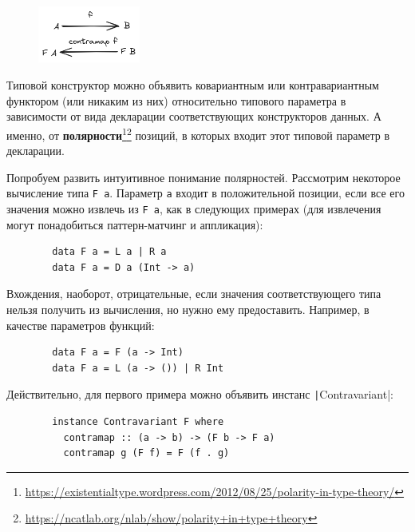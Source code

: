 \documentclass[12pt]{article}
\newcommand{\vocab}[1]{\textbf{#1}} %
\begin{document}
    \begin{figure}[H]
        \centering
        \includegraphics[width=0.3\textwidth]{figs/contra-functor}
    \end{figure}

    Типовой конструктор можно объявить ковариантным или контравариантным функтором (или никаким из них) относительно типового параметра в зависимости от вида декларации соответствующих конструкторов данных.
    А именно, от \vocab{полярности}\footnote{\url{https://existentialtype.wordpress.com/2012/08/25/polarity-in-type-theory/}}\footnote{\url{https://ncatlab.org/nlab/show/polarity+in+type+theory}} позиций, в которых входит этот типовой параметр в декларации.

    Попробуем развить интуитивное понимание полярностей.
    Рассмотрим некоторое вычисление типа \texttt{F a}.
    Параметр \texttt{a} входит в положительной позиции, если все его значения можно извлечь из \texttt{F a}, как в следующих примерах (для извлечения могут понадобиться паттерн-матчинг и аппликация):
    \begin{verbatim}
        data F a = L a | R a
        data F a = D a (Int -> a)
    \end{verbatim}

    Вхождения, наоборот, отрицательные, если значения соответствующего типа нельзя получить из вычисления, но нужно ему предоставить.
    Например, в качестве параметров функций:
    \begin{verbatim}
        data F a = F (a -> Int)
        data F a = L (a -> ()) | R Int
    \end{verbatim}
    Действительно, для первого примера можно объявить инстанс \texttt|Contravariant|:
    \begin{verbatim}
        instance Contravariant F where
          contramap :: (a -> b) -> (F b -> F a)
          contramap g (F f) = F (f . g)
    \end{verbatim}
\end{document}

